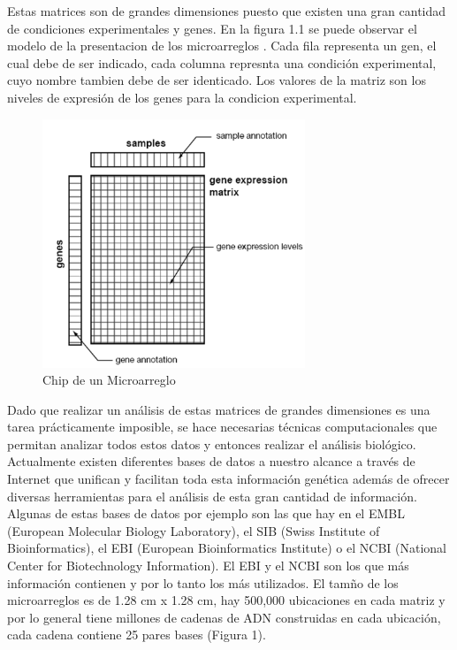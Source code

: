 \documentclass[12pt,letterpaper]{article}
\begin{document}
Estas matrices son de grandes dimensiones puesto que existen una gran cantidad de condiciones experimentales y genes. En la figura 1.1 se puede observar el modelo de la presentacion de los microarreglos . Cada fila representa un gen, el cual debe de ser indicado, cada columna represnta una condición experimental, cuyo nombre tambien debe de ser identicado. Los valores de la matriz son los niveles de expresión de los genes para la condicion experimental.
\begin{figure}[H]
\begin{center}
\includegraphics[width=0.7\textwidth]{matrix.png}
\end{center}
\caption{Chip de un Microarreglo}
\end{figure}
Dado que realizar un análisis de estas matrices de grandes dimensiones es una tarea prácticamente imposible, se hace necesarias técnicas computacionales que permitan analizar todos estos datos y entonces realizar el análisis biológico.\\
Actualmente existen diferentes bases de datos a nuestro alcance a través de Internet que unifican y facilitan toda esta información genética además de ofrecer diversas herramientas para el análisis de esta gran cantidad de información. Algunas de estas bases de datos por ejemplo son las que hay en el EMBL (European Molecular Biology Laboratory), el SIB (Swiss Institute of Bioinformatics), el EBI (European Bioinformatics Institute) o el NCBI (National Center for Biotechnology Information). El EBI y el NCBI son los que más información contienen y por lo tanto los más utilizados.
El tamño de los microarreglos es de 1.28 cm x 1.28 cm, hay 500,000 ubicaciones en cada matriz y por lo general tiene millones de cadenas de ADN construidas en cada ubicación, cada cadena contiene 25 pares bases (Figura 1).
\end{document}
